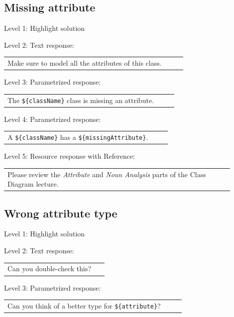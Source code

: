 \subsection{Missing attribute}

\noindent Level 1: Highlight solution \medskip

\noindent Level 2: Text response: \medskip

\begin{tabular}{|p{0.9\linewidth}}
Make sure to model all the attributes of this class.
\end{tabular} \medskip

\noindent Level 3: Parametrized response: \medskip

\begin{tabular}{|p{0.9\linewidth}}
The \verb|${className}| class is missing an attribute.
\end{tabular} \medskip

\noindent Level 4: Parametrized response: \medskip

\begin{tabular}{|p{0.9\linewidth}}
A \verb|${className}| has a \verb|${missingAttribute}|.
\end{tabular} \medskip

\noindent Level 5: Resource response with Reference: \medskip

\begin{tabular}{|p{0.9\linewidth}}
Please review the \textit{Attribute} and \textit{Noun Analysis} parts of the Class Diagram lecture.
\end{tabular} \medskip


\subsection{Wrong attribute type}

\noindent Level 1: Highlight solution \medskip

\noindent Level 2: Text response: \medskip

\begin{tabular}{|p{0.9\linewidth}}
Can you double-check this?
\end{tabular} \medskip

\noindent Level 3: Parametrized response: \medskip

\begin{tabular}{|p{0.9\linewidth}}
Can you think of a better type for \verb|${attribute}|?
\end{tabular} \medskip

